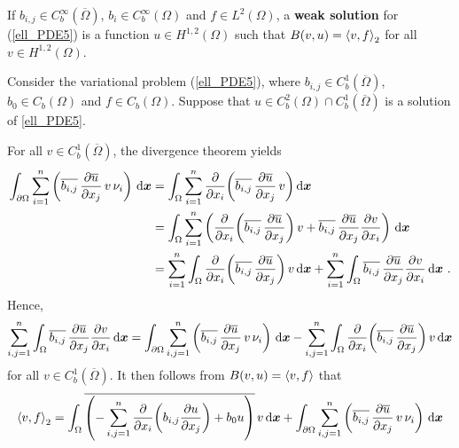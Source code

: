 \begin{defn}
If $\displaystyle b_{i,j} \in C^\infty_b(\overline{\Omega})$,
$\displaystyle b_i \in C^\infty_b(\Omega)$ and
$\displaystyle f \in L^2(\Omega)$,
a {\bfseries weak solution}
for (\ref{ell_PDE5}) is a function
$\displaystyle u \in H^{1,2}(\Omega)$ such that
$\displaystyle B(v,u) = \ps{v}{f}_2$ for all
$\displaystyle v \in H^{1,2}(\Omega)$.
\end{defn}

Consider the variational problem (\ref{ell_PDE5}), where
$\displaystyle b_{i,j}\in C^{1}_b(\overline{\Omega})$, $b_0 \in C_b(\Omega)$ and
$f\in C_b(\Omega)$.  Suppose that
$\displaystyle u \in C^2_b(\Omega)\cap C^1_b(\overline{\Omega})$ is a
solution of \ref{ell_PDE5}.

For all $v \in C^1_b(\overline{\Omega})$, the divergence theorem yields
\begin{align*}
\int_{\partial \Omega}
\sum_{i=1}^n \left( \overline{b_{i,j}}\,\pdydx{\overline{u}}{x_j}
\,v \, \nu_i \right) \dx{\VEC{x}}
&= \int_\Omega \sum_{i=1}^n \pdfdx{\left( \overline{b_{i,j}}\,
\pdydx{\overline{u}}{x_j} \,v\right)}{x_i} \dx{\VEC{x}} \\
&= \int_\Omega \sum_{i=1}^n \left( \pdfdx{\left( \overline{b_{i,j}}\,
\pdydx{\overline{u}}{x_j}\right)}{x_i} \,v +
\overline{b_{i,j}}\,\pdydx{\overline{u}}{x_j} \pdydx{v}{x_i} \right)
\dx{\VEC{x}} \\
&= \sum_{i=1}^n \int_\Omega \pdfdx{\left( \overline{b_{i,j}}\,
\pdydx{\overline{u}}{x_j}\right)}{x_i} \,v \dx{\VEC{x}}
+ \sum_{i=1}^n \int_\Omega
\overline{b_{i,j}}\,\pdydx{\overline{u}}{x_j} \pdydx{v}{x_i}
\dx{\VEC{x}} \ .
\end{align*}
Hence,
\[
\sum_{i,j=1}^n \int_\Omega
\overline{b_{i,j}}\,\pdydx{\overline{u}}{x_j} \pdydx{v}{x_i} \dx{\VEC{x}}
= \int_{\partial \Omega}
\sum_{i,j=1}^n \left( \overline{b_{i,j}}\,\pdydx{\overline{u}}{x_j}
\,v \, \nu_i \right) \dx{\VEC{x}}
- \sum_{i,j=1}^n \int_\Omega \pdfdx{\left( \overline{b_{i,j}}\,
\pdydx{\overline{u}}{x_j}\right)}{x_i} \,v \dx{\VEC{x}} 
\]
for all $v \in C^1_b(\overline{\Omega})$.  It then follows from
$B(v,u) = \ps{v}{f}$ that
\begin{equation} \label{ell_Neum_CWC}
\ps{v}{f}_2 
= \int_\Omega \overline{\left(-
\sum_{i,j=1}^n \pdfdx{\left( b_{i,j} \pdydx{u}{x_j} \right)}{x_i}
+ b_0 u \right)} \, v \dx{\VEC{x}} + \int_{\partial \Omega}
\sum_{i,j=1}^n \left( \overline{b_{i,j}}\,\pdydx{\overline{u}}{x_j}
\,v \, \nu_i \right) \dx{\VEC{x}} 
\end{equation}

